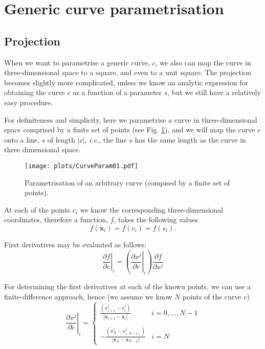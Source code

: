 \documentclass[11pt]{amsart}
\newcommand{\vecx}{\boldsymbol{x}}
\begin{document}
\section{Generic curve parametrisation}

\subsection{Projection}

When we want to parametrise a generic curve, $c$, we also can map the 
curve in three-dimensional space to a square, and even to a unit square. The projection becomes
slightly more complicated, unless we know an analytic expression for
obtaining the curve $c$ as a function of a parameter $s$, but we
still have a relatively easy procedure.

For definiteness and simplicity, here we parametrise a curve in three-dimensional space
comprised by a finite set of points (see Fig. \ref{fig:arbcurveparam}), and we will map
the curve $c$ onto a line, $s$ of length $|c|$, \textit{i.e.}, the line $s$ has the same
length as the curve in three dimensional space.

\begin{figure}\label{fig:arbcurveparam}
\centering
\texttt{[image: plots/CurveParam01.pdf]}
\caption{Parametrisation of an arbitrary curve (compised by a finite
set of points).}
\end{figure}

At each of the points $c_i$ we know the corresponding three-dimensional coordinates,
therefore a function, $f$, takes the following values
\begin{equation}
   f(\vecx_i)=f(c_i)=f(s_i).
\end{equation}

First derivatives may be evaluated as follows:
%
\begin{equation}
\left.\frac{\partial f}{\partial c}\right|_i=
\left(\left.\frac{\partial x^j}{\partial c}\right|_i\right)
\frac{\partial f}{\partial x^j}
\end{equation}
%

For determining the first derivatives at each of the known points, we can use a finite-difference
approach, hence (we assume we know $N$ points of the curve $c$)
%
\begin{equation}
\left.\frac{\partial x^j}{\partial c}\right|_i=\left\{
\begin{array}{ll}
   \frac{\left(x^j_{i+1}-x^j_i\right)}{|\vecx_{i+1}-\vecx_i|} & i = 0,\dots,N-1 \\ \\
   -\frac{\left(x^j_{N}-x^j_(N-1)\right)}{|\vecx_{N}-\vecx_{N-1}|} & i = N
\end{array}
\right.
\end{equation}
%
\end{document}
